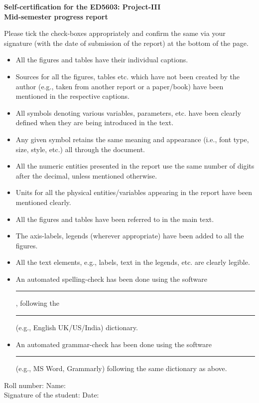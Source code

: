 \documentclass[11pt,a4paper]{article}
\newcommand{\sq}{\scalebox{1.5}{$\square$}}
\begin{document}
\pagestyle{empty}
\begin{center}
	\Large{\textbf{Self-certification for the ED5603: Project-III \\Mid-semester progress report}}
\end{center}
\vspace{1 cm}
\noindent Please tick the check-boxes appropriately and confirm the same via your signature (with the date of submission of the report) at the bottom of the page. 
\begin{itemize}
    \item[\sq] All the figures and tables have their individual captions.
	\item[\sq] Sources for all the figures, tables etc. which have not been created by the author (e.g., taken from another report or a paper/book) have been mentioned in the respective captions.
	\item[\sq] All symbols denoting various variables, parameters, etc. have been clearly defined when they are being introduced in the text.
	\item[\sq] Any given symbol retains the same meaning and appearance (i.e., font type, size, style, etc.) all through the document.
	\item[\sq] All the numeric entities presented in the report use the same number of digits after the decimal, unless mentioned otherwise.
	\item[\sq] Units for all the physical entities/variables appearing in the report have been mentioned clearly.
	
	\item[\sq] All the figures and tables have been referred to in the main text.
	\item[\sq] The axis-labels, legends (wherever appropriate) have been added to all the figures.
	\item[\sq] All the text elements, e.g., labels, text in the legends, etc. are clearly legible.
	\item[\sq] An automated spelling-check has been done using the software \rule{5 cm}{0.1 mm}, following the \rule{5 cm}{0.1 mm} (e.g., English UK/US/India) dictionary.
	\item[\sq] An automated grammar-check has been done using the software \rule{5 cm}{0.1 mm} (e.g., MS Word, Grammarly) following the same dictionary as above. 
\end{itemize}
\vspace{1 cm}
Roll number: \hfill Name: \hspace{5 cm} \\

\vspace{1.5 cm}
\noindent Signature of the student: \hfill Date: \hspace{5 cm}
\end{document}
